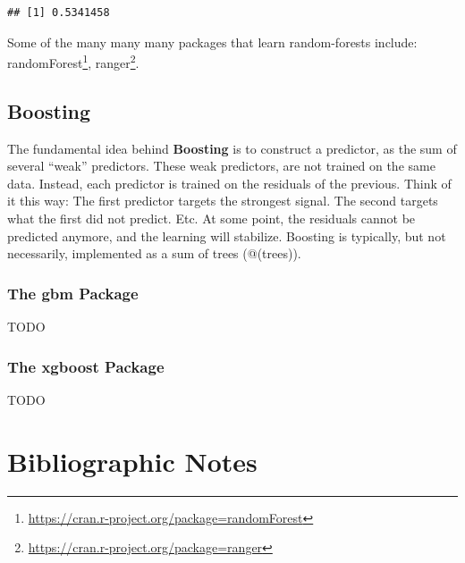 \documentclass[]{book}
\renewcommand{\href}[2]{#2\footnote{\url{#1}}}
\theoremstyle{definition}
\theoremstyle{definition}
\theoremstyle{definition}
\theoremstyle{remark}
\begin{document}
\begin{verbatim}
## [1] 0.5341458
\end{verbatim}

Some of the many many many packages that learn random-forests include: \href{https://cran.r-project.org/package=randomForest}{randomForest}, \href{https://cran.r-project.org/package=ranger}{ranger}.

\hypertarget{boosting}{%
\subsection{Boosting}\label{boosting}}

The fundamental idea behind \textbf{Boosting} is to construct a predictor, as the sum of several ``weak'' predictors.
These weak predictors, are not trained on the same data.
Instead, each predictor is trained on the residuals of the previous.
Think of it this way:
The first predictor targets the strongest signal.
The second targets what the first did not predict.
Etc.
At some point, the residuals cannot be predicted anymore, and the learning will stabilize.
Boosting is typically, but not necessarily, implemented as a sum of trees (@(trees)).

\hypertarget{the-gbm-package}{%
\subsubsection{The gbm Package}\label{the-gbm-package}}

TODO

\hypertarget{the-xgboost-package}{%
\subsubsection{The xgboost Package}\label{the-xgboost-package}}

TODO

\hypertarget{bibliographic-notes-8}{%
\section{Bibliographic Notes}\label{bibliographic-notes-8}}
\end{document}
